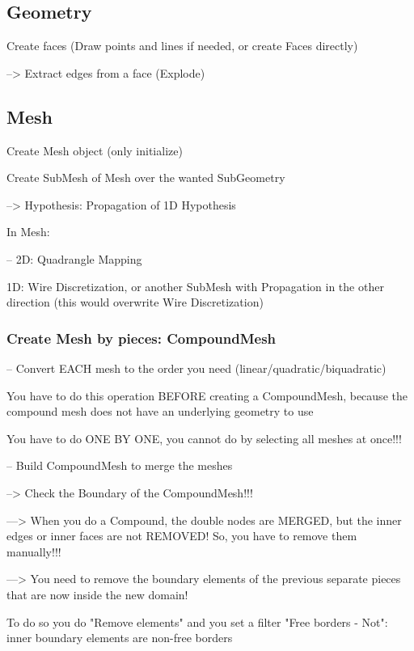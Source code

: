 \documentclass[10pt]{book}
\begin{document}
\subsection{Geometry}


Create faces (Draw points and lines if needed, or create Faces directly)

   --> Extract edges from a face (Explode)
   
\subsection{Mesh}
 
Create Mesh object (only initialize)

Create SubMesh of Mesh over the wanted SubGeometry

   --> Hypothesis: Propagation of 1D Hypothesis

In Mesh:

--   2D: Quadrangle Mapping

   1D: Wire Discretization, or another SubMesh with Propagation in the other direction (this would overwrite Wire Discretization)

  
  \subsubsection{Create Mesh by pieces: CompoundMesh}
  
-- Convert EACH mesh to the order you need (linear/quadratic/biquadratic)

  You have to do this operation BEFORE creating a CompoundMesh,
  because the compound mesh does not have an underlying geometry to use 
   
  You have to do ONE BY ONE, you cannot do by selecting all meshes at once!!! 

  
-- Build CompoundMesh to merge the meshes

     --> Check the Boundary of the CompoundMesh!!! 
     
     ---> When you do a Compound, the double nodes are MERGED, but the inner edges or inner faces are not REMOVED! So, you have to remove them manually!!!
     
     ---> You need to remove the boundary elements of the previous separate pieces that are now inside the new domain!
     
          To do so you do "Remove elements" and you set a filter "Free borders - Not": inner boundary elements are non-free borders
          
\end{document}

